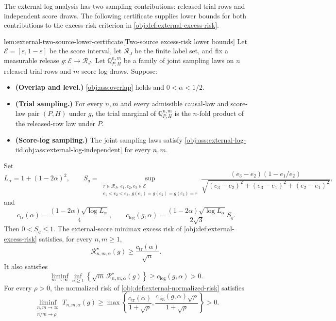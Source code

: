 \documentclass[11pt]{article}
\begin{document}
The external-log analysis has two sampling contributions: released trial rows and independent score draws. The following certificate supplies lower bounds for both contributions to the excess-risk criterion in \cref{obj:def:external-excess-risk}.

\begin{lemmav}{lem:external-two-source-lower-certificate}[Two-source excess-risk lower bounds]
Let \(\mathcal E=[\varepsilon,1-\varepsilon]\) be the score interval, let \(\mathcal R_J\) be the finite label set, and fix a measurable release \(g:\mathcal E\to\mathcal R_J\). Let \(\mathbb Q_{P,H}^{n,m}\) be a family of joint sampling laws on \(n\) released trial rows and \(m\) score-log draws. Suppose:

\begin{itemize}
\item \textbf{(Overlap and level.)} \cref{obj:ass:overlap} holds and \(0<\alpha<1/2\).
\item \textbf{(Trial sampling.)} For every \(n,m\) and every admissible causal-law and score-law pair \((P,H)\) under \(g\), the trial marginal of \(\mathbb Q_{P,H}^{n,m}\) is the \(n\)-fold product of the released-row law under \(P\).
\item \textbf{(Score-log sampling.)} The joint sampling laws satisfy \cref{obj:ass:external-log-iid,obj:ass:external-log-independent} for every \(n,m\).
\end{itemize}

Set
\[
L_\alpha=1+(1-2\alpha)^2,\qquad
S_g=\sup_{\substack{r\in\mathcal R_J,\ e_1,e_2,e_3\in\mathcal E\\
e_1<e_2<e_3,\ g(e_1)=g(e_2)=g(e_3)=r}}
\frac{(e_3-e_2)(1-e_1/e_2)}
{\sqrt{(e_3-e_2)^2+(e_3-e_1)^2+(e_2-e_1)^2}},
\]
and
\[
c_{\mathrm{tr}}(\alpha)
=\frac{(1-2\alpha)\sqrt{\log L_\alpha}}{4},
\qquad
c_{\mathrm{log}}(g,\alpha)
=\frac{(1-2\alpha)\sqrt{\log L_\alpha}}{2\sqrt{3}}S_g.
\]
Then \(0<S_g\leq 1\). The external-score minimax excess risk of \cref{obj:def:external-excess-risk} satisfies, for every \(n,m\geq 1\),
\[
\mathcal R^\star_{n,m,\alpha}(g)
\geq \frac{c_{\mathrm{tr}}(\alpha)}{\sqrt n}.
\]
It also satisfies
\[
\liminf_{m\to\infty}\inf_{n\geq 1}
\left\{\sqrt m\,\mathcal R^\star_{n,m,\alpha}(g)\right\}
\geq c_{\mathrm{log}}(g,\alpha)>0.
\]
For every \(\rho>0\), the normalized risk of \cref{obj:def:external-normalized-risk} satisfies
\[
\liminf_{\substack{n,m\to\infty\\ n/m\to\rho}}
T_{n,m,\alpha}(g)
\geq
\max\left\{
\frac{c_{\mathrm{tr}}(\alpha)}{1+\sqrt\rho},
\frac{c_{\mathrm{log}}(g,\alpha)\sqrt\rho}{1+\sqrt\rho}
\right\}>0.
\]
\end{lemmav}
\end{document}
